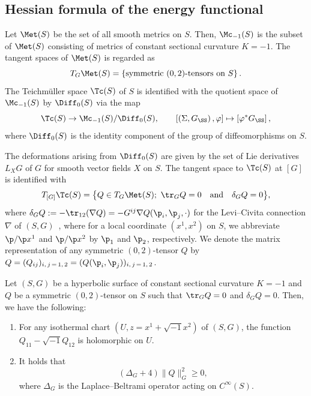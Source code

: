 \subsection{Hessian formula of the energy functional}\label{ss1}


Let $\Met(S)$ be the set of all smooth metrics on $S$. Then, $\Mc_{-1}(S)$ is the subset of $\Met(S)$ consisting of metrics of constant sectional curvature $K=-1$. The tangent spaces of $\Met(S)$ is regarded as
\[
T_G\Met(S)=\left\{\text{symmetric}\ (0,2)\text{-tensors on}\ S\right\}.
\]
The {Teichm\"uller space} $\Tc(S)$ of $S$ is identified with the quotient space of $\Mc_{-1}(S)$ by ${\Diff}_0(S)$ via the map
\[
\Tc(S) \to \Mc_{-1}(S)/{\Diff}_0(S), \qquad \left[\left(\Sigma, G_\SS\right), \varphi\right]\mapsto \left[\varphi^\ast G_\SS\right],
\]
where ${\Diff}_0(S)$ is the identity component of the group of diffeomorphisms on $S$.



The deformations arising from ${\Diff}_0(S)$ are given by the set of Lie derivatives $L_XG$ of $G$ for smooth vector fields $X$ on $S$. The tangent space to $\Tc(S)$ at $[G]$ is identified with
\[
T_{[G]}\Tc(S)=\big\{Q\in T_G\Met(S);\ \tr_GQ=0\quad \text{and}\quad \delta_GQ=0\big\},
\]
where $\delta_GQ:=-{\tr}_{12}(\nabla Q)=-G^{ij}\nabla{Q}(\p_i,\p_j, \cdot)$ for the Levi--Civita connection $\nabla$ of $(S, G)$~\cite[Section~3.2]{Yamada2}, where for a local coordinate $(x^1,x^2)$ on $S$, we abbreviate $\p/\p x^1$ and $\p/\p x^2$ by $\p_1$ and $\p_2$, respectively. We denote the matrix representation of any symmetric $(0,2)$-tensor $Q$ by $Q=(Q_{ij})_{i,\,j\,=\,1,\,2}=(Q(\p_i,\p_j))_{i,\,j\,=\,1,\,2}$.

\begin{lemm}\label{Lem:Qholomorphic}
Let $(S,G)$ be a hyperbolic surface of constant sectional curvature $K=-1$ and $Q$ be a symmetric $(0,2)$-tensor on $S$ such that ${\tr}_G Q=0$ and $\delta_GQ=0$. Then, we have the following:
\begin{enumerate}\romanenumi
\item\label{lemm3.1.1} For any isothermal chart $(U, z=x^1+\sqrt{-1}x^2)$ of $(S,G)$, the function $Q_{11}-\sqrt{-1}Q_{12}$ is holomorphic on $U$.
\item\label{lemm3.1.2} It holds that
\[
\left(\Delta_G+4\right)\|Q\|^2_G\geq 0,
\]
where $\Delta_G$ is the Laplace--Beltrami operator acting on $C^{\infty}(S)$.
\end{enumerate}
\end{lemm}

